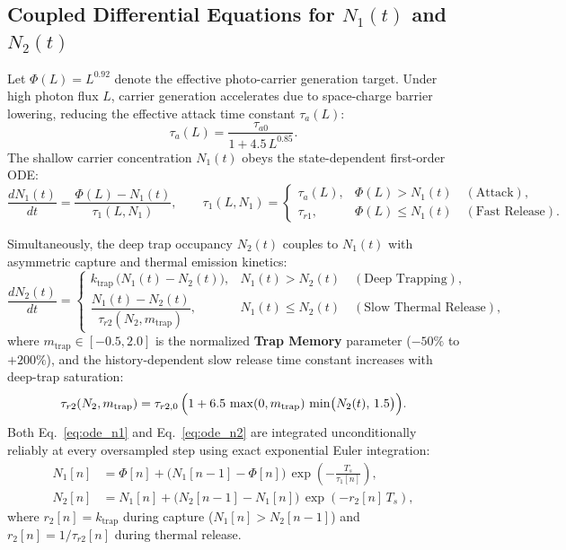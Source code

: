 \documentclass[11pt,a4paper]{article}
\begin{document}
\subsection{Coupled Differential Equations for \texorpdfstring{$N_1(t)$}{N1(t)} and \texorpdfstring{$N_2(t)$}{N2(t)}}

Let $\Phi(L) = L^{0.92}$ denote the effective photo-carrier generation target. Under high photon flux $L$, carrier generation accelerates due to space-charge barrier lowering, reducing the effective attack time constant $\tau_a(L)$:
\begin{equation}
    \tau_a(L) = \frac{\tau_{a0}}{1 + 4.5\,L^{0.85}}.
\end{equation}
The shallow carrier concentration $N_1(t)$ obeys the state-dependent first-order ODE:
\begin{equation}
    \frac{dN_1(t)}{dt} = \frac{\Phi(L) - N_1(t)}{\tau_1(L, N_1)}, \qquad
    \tau_1(L, N_1) = \begin{cases}
        \tau_a(L), & \Phi(L) > N_1(t) \quad (\text{Attack}), \\[0.4em]
        \tau_{r1}, & \Phi(L) \le N_1(t) \quad (\text{Fast Release}).
    \end{cases}
    \label{eq:ode_n1}
\end{equation}

Simultaneously, the deep trap occupancy $N_2(t)$ couples to $N_1(t)$ with asymmetric capture and thermal emission kinetics:
\begin{equation}
    \frac{dN_2(t)}{dt} = \begin{cases}
        k_{\text{trap}}\,\bigl(N_1(t) - N_2(t)\bigr), & N_1(t) > N_2(t) \quad (\text{Deep Trapping}), \\[0.6em]
        \dfrac{N_1(t) - N_2(t)}{\tau_{r2}(N_2, m_{\text{trap}})}, & N_1(t) \le N_2(t) \quad (\text{Slow Thermal Release}),
    \end{cases}
    \label{eq:ode_n2}
\end{equation}
where $m_{\text{trap}} \in [-0.5, 2.0]$ is the normalized \textbf{Trap Memory} parameter ($-50\%$ to $+200\%$), and the history-dependent slow release time constant increases with deep-trap saturation:
\begin{equation}
    \tau_{r2}(N_2, m_{\text{trap}}) = \tau_{r2,0}\,\Bigl(1 + 6.5\,\max(0, m_{\text{trap}})\,\min\bigl(N_2(t),\,1.5\bigr)\Bigr).
\end{equation}
Both Eq.~\eqref{eq:ode_n1} and Eq.~\eqref{eq:ode_n2} are integrated unconditionally reliably at every oversampled step using exact exponential Euler integration:
\begin{align}
    N_1[n] &= \Phi[n] + \bigl(N_1[n-1] - \Phi[n]\bigr)\,\exp\!\left(-\frac{T_s}{\tau_1[n]}\right), \\
    N_2[n] &= N_1[n] + \bigl(N_2[n-1] - N_1[n]\bigr)\,\exp\!\left(-r_2[n]\,T_s\right),
\end{align}
where $r_2[n] = k_{\text{trap}}$ during capture ($N_1[n] > N_2[n-1]$) and $r_2[n] = 1 / \tau_{r2}[n]$ during thermal release.
\end{document}
